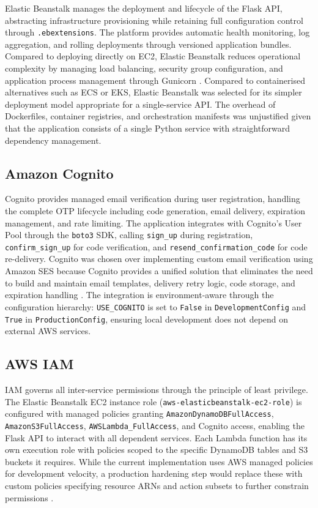 \documentclass[conference]{IEEEtran}
\begin{document}
Elastic Beanstalk manages the deployment and lifecycle of the Flask API, abstracting infrastructure provisioning while retaining full configuration control through \texttt{.ebextensions}. The platform provides automatic health monitoring, log aggregation, and rolling deployments through versioned application bundles. Compared to deploying directly on EC2, Elastic Beanstalk reduces operational complexity by managing load balancing, security group configuration, and application process management through Gunicorn \cite{awseb2024}. Compared to containerised alternatives such as ECS or EKS, Elastic Beanstalk was selected for its simpler deployment model appropriate for a single-service API. The overhead of Dockerfiles, container registries, and orchestration manifests was unjustified given that the application consists of a single Python service with straightforward dependency management.

\subsection{Amazon Cognito}

Cognito provides managed email verification during user registration, handling the complete OTP lifecycle including code generation, email delivery, expiration management, and rate limiting. The application integrates with Cognito's User Pool through the \texttt{boto3} SDK, calling \texttt{sign\_up} during registration, \texttt{confirm\_sign\_up} for code verification, and \texttt{resend\_confirmation\_code} for code re-delivery. Cognito was chosen over implementing custom email verification using Amazon SES because Cognito provides a unified solution that eliminates the need to build and maintain email templates, delivery retry logic, code storage, and expiration handling \cite{awscognito2024}. The integration is environment-aware through the configuration hierarchy: \texttt{USE\_COGNITO} is set to \texttt{False} in \texttt{DevelopmentConfig} and \texttt{True} in \texttt{ProductionConfig}, ensuring local development does not depend on external AWS services.

\subsection{AWS IAM}

IAM governs all inter-service permissions through the principle of least privilege. The Elastic Beanstalk EC2 instance role (\texttt{aws-elasticbeanstalk-ec2-role}) is configured with managed policies granting \texttt{AmazonDynamoDBFullAccess}, \texttt{AmazonS3FullAccess}, \texttt{AWSLambda\_FullAccess}, and Cognito access, enabling the Flask API to interact with all dependent services. Each Lambda function has its own execution role with policies scoped to the specific DynamoDB tables and S3 buckets it requires. While the current implementation uses AWS managed policies for development velocity, a production hardening step would replace these with custom policies specifying resource ARNs and action subsets to further constrain permissions \cite{awsiam2024}.
\end{document}
